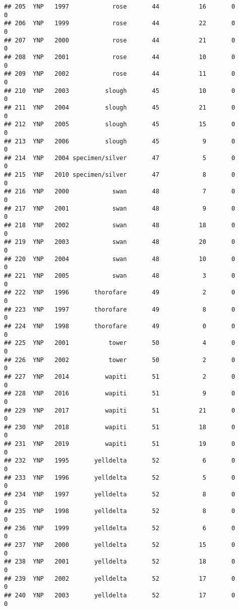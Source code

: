 \documentclass[
]{article}
\begin{document}
\begin{verbatim}
## 205  YNP   1997            rose       44           16       0        0
## 206  YNP   1999            rose       44           22       0        0
## 207  YNP   2000            rose       44           21       0        0
## 208  YNP   2001            rose       44           10       0        0
## 209  YNP   2002            rose       44           11       0        0
## 210  YNP   2003          slough       45           10       0        0
## 211  YNP   2004          slough       45           21       0        0
## 212  YNP   2005          slough       45           15       0        0
## 213  YNP   2006          slough       45            9       0        0
## 214  YNP   2004 specimen/silver       47            5       0        0
## 215  YNP   2010 specimen/silver       47            8       0        0
## 216  YNP   2000            swan       48            7       0        0
## 217  YNP   2001            swan       48            9       0        0
## 218  YNP   2002            swan       48           18       0        0
## 219  YNP   2003            swan       48           20       0        0
## 220  YNP   2004            swan       48           10       0        0
## 221  YNP   2005            swan       48            3       0        0
## 222  YNP   1996       thorofare       49            2       0        0
## 223  YNP   1997       thorofare       49            8       0        0
## 224  YNP   1998       thorofare       49            0       0        0
## 225  YNP   2001           tower       50            4       0        0
## 226  YNP   2002           tower       50            2       0        0
## 227  YNP   2014          wapiti       51            2       0        0
## 228  YNP   2016          wapiti       51            9       0        0
## 229  YNP   2017          wapiti       51           21       0        0
## 230  YNP   2018          wapiti       51           18       0        0
## 231  YNP   2019          wapiti       51           19       0        0
## 232  YNP   1995       yelldelta       52            6       0        0
## 233  YNP   1996       yelldelta       52            5       0        0
## 234  YNP   1997       yelldelta       52            8       0        0
## 235  YNP   1998       yelldelta       52            8       0        0
## 236  YNP   1999       yelldelta       52            6       0        0
## 237  YNP   2000       yelldelta       52           15       0        0
## 238  YNP   2001       yelldelta       52           18       0        0
## 239  YNP   2002       yelldelta       52           17       0        0
## 240  YNP   2003       yelldelta       52           17       0        0

\end{verbatim}
\end{document}
